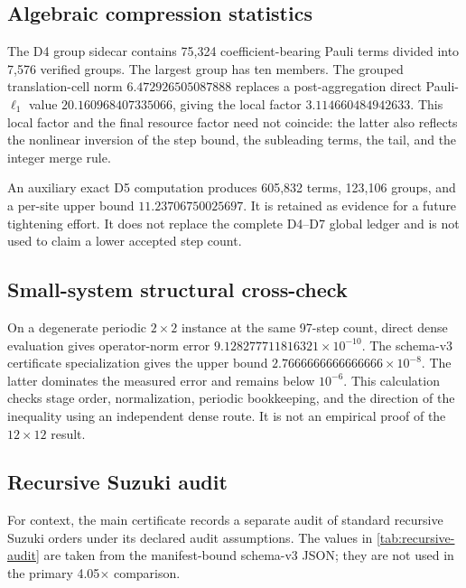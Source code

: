 \subsection{Algebraic compression statistics}

The D4 group sidecar contains 75,324 coefficient-bearing Pauli terms divided
into 7,576 verified groups.  The largest group has ten members.  The grouped
translation-cell norm $6.472926505087888$ replaces a post-aggregation direct
Pauli-$\ell_1$ value $20.160968407335066$, giving the local factor
$3.114660484942633$.  This local factor and the final resource factor need not
coincide: the latter also reflects the nonlinear inversion of the step bound,
the subleading terms, the tail, and the integer merge rule.

An auxiliary exact D5 computation produces 605,832 terms, 123,106 groups, and
a per-site upper bound $11.23706750025697$.  It is retained as evidence for a
future tightening effort.  It does not replace the complete D4--D7 global
ledger and is not used to claim a lower accepted step count.

\subsection{Small-system structural cross-check}

On a degenerate periodic $2\times2$ instance at the same 97-step count, direct
dense evaluation gives operator-norm error
$9.128277711816321\times10^{-10}$.  The schema-v3 certificate specialization
gives the upper bound $2.7666666666666666\times10^{-8}$.  The latter dominates
the measured error and remains below $10^{-6}$.  This calculation checks stage
order, normalization, periodic bookkeeping, and the direction of the
inequality using an independent dense route.  It is not an empirical proof of
the $12\times12$ result.

\subsection{Recursive Suzuki audit}

For context, the main certificate records a separate audit of standard
recursive Suzuki orders under its declared audit assumptions.  The values in
\cref{tab:recursive-audit} are taken from the manifest-bound schema-v3 JSON;
they are not used in the primary 4.05$\times$ comparison.

